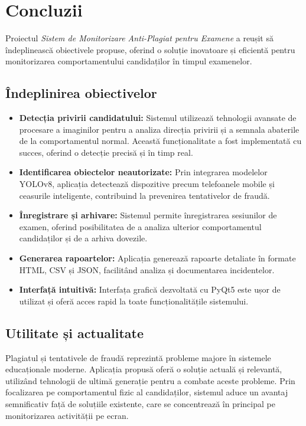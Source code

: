 \documentclass[12pt,a4paper]{article}
\begin{document}
\section{Concluzii}

Proiectul \textit{Sistem de Monitorizare Anti-Plagiat pentru Examene} a reușit să îndeplinească obiectivele propuse, oferind o soluție inovatoare și eficientă pentru monitorizarea comportamentului candidaților în timpul examenelor. 

\subsection{Îndeplinirea obiectivelor}

\begin{itemize}
    \item \textbf{Detecția privirii candidatului:} Sistemul utilizează tehnologii avansate de procesare a imaginilor pentru a analiza direcția privirii și a semnala abaterile de la comportamentul normal. Această funcționalitate a fost implementată cu succes, oferind o detecție precisă și în timp real.
    
    \item \textbf{Identificarea obiectelor neautorizate:} Prin integrarea modelelor YOLOv8, aplicația detectează dispozitive precum telefoanele mobile și ceasurile inteligente, contribuind la prevenirea tentativelor de fraudă.
    
    \item \textbf{Înregistrare și arhivare:} Sistemul permite înregistrarea sesiunilor de examen, oferind posibilitatea de a analiza ulterior comportamentul candidaților și de a arhiva dovezile.
    
    \item \textbf{Generarea rapoartelor:} Aplicația generează rapoarte detaliate în formate HTML, CSV și JSON, facilitând analiza și documentarea incidentelor.
    
    \item \textbf{Interfață intuitivă:} Interfața grafică dezvoltată cu PyQt5 este ușor de utilizat și oferă acces rapid la toate funcționalitățile sistemului.
\end{itemize}

\subsection{Utilitate și actualitate}

Plagiatul și tentativele de fraudă reprezintă probleme majore în sistemele educaționale moderne. Aplicația propusă oferă o soluție actuală și relevantă, utilizând tehnologii de ultimă generație pentru a combate aceste probleme. Prin focalizarea pe comportamentul fizic al candidaților, sistemul aduce un avantaj semnificativ față de soluțiile existente, care se concentrează în principal pe monitorizarea activității pe ecran.
\end{document}
